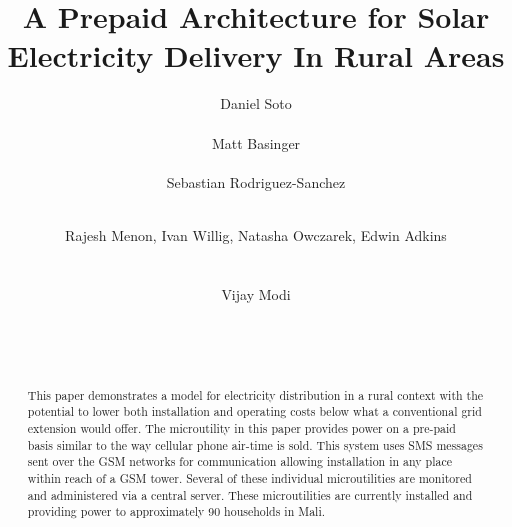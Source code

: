 \documentclass{sig-alternate}
\begin{document}

\title{A Prepaid Architecture for Solar Electricity Delivery In Rural Areas}
\author{
\alignauthor
Daniel Soto\\
\\
%
\alignauthor
Matt Basinger\\
\\
\alignauthor
Sebastian Rodriguez-Sanchez\\
\\
%
\and
%
\alignauthor
Rajesh Menon, Ivan Willig, Natasha Owczarek, Edwin Adkins\\
\\
\\
%
\alignauthor
Vijay Modi\\
\\
\\
\\
}

\maketitle

\begin{abstract}
This paper demonstrates a model for electricity
distribution in a rural context with the potential
to lower both installation and operating costs below
what a conventional grid extension would offer.
The microutility in this paper provides power on a
pre-paid basis similar to the way cellular phone
air-time is sold.
This system uses SMS messages sent 
over the GSM networks
for communication allowing installation in any place
within reach of a GSM tower.
Several of these individual microutilities are monitored
and administered via a central server.
These microutilities are currently installed and providing
power to approximately 90 households in Mali.
\end{abstract}
\end{document}
